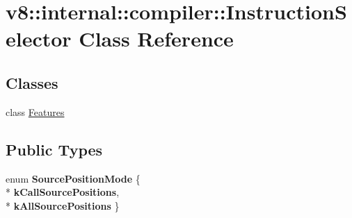 \hypertarget{classv8_1_1internal_1_1compiler_1_1_instruction_selector}{}\section{v8\+:\+:internal\+:\+:compiler\+:\+:Instruction\+Selector Class Reference}
\label{classv8_1_1internal_1_1compiler_1_1_instruction_selector}
\subsection*{Classes}
\begin{DoxyCompactItemize}
\item 
class \hyperlink{classv8_1_1internal_1_1compiler_1_1_instruction_selector_1_1_features}{Features}
\end{DoxyCompactItemize}
\subsection*{Public Types}
\begin{DoxyCompactItemize}
\item 
enum {\bfseries Source\+Position\+Mode} \{ \\*
{\bfseries k\+Call\+Source\+Positions}, 
\\*
{\bfseries k\+All\+Source\+Positions}
 \}\hypertarget{classv8_1_1internal_1_1compiler_1_1_instruction_selector_ac985d7ff7e0eeb569c3b612182388601}{}\label{classv8_1_1internal_1_1compiler_1_1_instruction_selector_ac985d7ff7e0eeb569c3b612182388601}

\end{DoxyCompactItemize}
